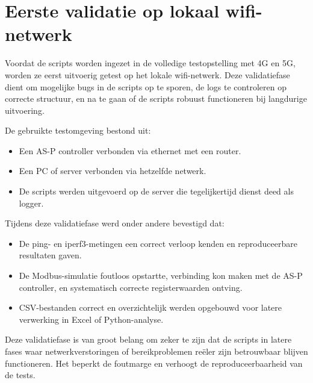 \section{Eerste validatie op lokaal wifi-netwerk}

Voordat de scripts worden ingezet in de volledige testopstelling met 4G en 5G, worden ze eerst uitvoerig getest op het lokale wifi-netwerk. Deze validatiefase dient om mogelijke bugs in de scripts op te sporen, de logs te controleren op correcte structuur, en na te gaan of de scripts robuust functioneren bij langdurige uitvoering.

De gebruikte testomgeving bestond uit:
\begin{itemize}
    \item Een AS-P controller verbonden via ethernet met een router.
    \item Een PC of server verbonden via hetzelfde netwerk.
    \item De scripts werden uitgevoerd op de server die tegelijkertijd dienst deed als logger.
\end{itemize}

Tijdens deze validatiefase werd onder andere bevestigd dat:
\begin{itemize}
    \item De ping- en iperf3-metingen een correct verloop kenden en reproduceerbare resultaten gaven.
    \item De Modbus-simulatie foutloos opstartte, verbinding kon maken met de AS-P controller, en systematisch correcte registerwaarden ontving.
    \item CSV-bestanden correct en overzichtelijk werden opgebouwd voor latere verwerking in Excel of Python-analyse.
\end{itemize}

Deze validatiefase is van groot belang om zeker te zijn dat de scripts in latere fases waar netwerkverstoringen of bereikproblemen reëler zijn betrouwbaar blijven functioneren. Het beperkt de foutmarge en verhoogt de reproduceerbaarheid van de tests.
